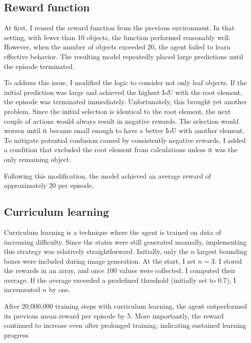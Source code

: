 \documentclass[
  digital,     %
  oneside,     %
  nosansbold,  %
  nocolorbold, %
  lof,         %
  lot,         %
]{fithesis4}
\begin{document}
\subsection{Reward function}

At first, I reused the reward function from the previous environment. In that setting, with fewer than 10 objects, the function performed reasonably well. However, when the number of objects exceeded 20, the agent failed to learn effective behavior. The resulting model repeatedly placed large predictions until the episode terminated.

To address this issue, I modified the logic to consider not only leaf objects. If the initial prediction was large and achieved the highest IoU with the root element, the episode was terminated immediately. Unfortunately, this brought yet another problem. Since the initial selection is identical to the root element, the next couple of actions would always result in negative rewards. The selection would worsen until it became small enough to have a better IoU with another element. To mitigate potential confusion caused by consistently negative rewards, I added a condition that excluded the root element from calculations unless it was the only remaining object.

Following this modification, the model achieved an average reward of approximately 20 per episode.

\subsection{Curriculum learning}

Curriculum learning is a technique where the agent is trained on data of increasing difficulty. Since the states were still generated manually, implementing this strategy was relatively straightforward. Initially, only the $n$ largest bounding boxes were included during image generation. At the start, I set $n=3$. I stored the rewards in an array, and once 100 values were collected, I computed their average. If the average exceeded a predefined threshold (initially set to 0.7), I incremented $n$ by one.

After 20,000,000 training steps with curriculum learning, the agent outperformed its previous mean reward per episode by 5. More importantly, the reward continued to increase even after prolonged training, indicating sustained learning progress.
\end{document}

